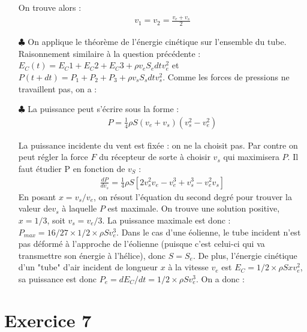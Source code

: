\documentclass{report}
\begin{document}
\begin{itemize}
	On trouve alors :
	\begin{align*}
		v_1=v_2=\frac{v_e+v_s}{2}
	\end{align*}
	
	\item[$\clubsuit$] On applique le théorème de l'énergie cinétique sur l'ensemble du tube. Raisonnement similaire à la question précédente : $E_C(t)=E_C1+E_C2+E_C3+\rho v_e S_e dtv_e^2$ et $P(t+dt)=P_1+P_2+P_3+\rho v_s S_s dtv_s^2$. Comme les forces de pressions ne travaillent pas, on a :
	
	\noindent{}
	
	\item[$\clubsuit$] La puissance peut s'écrire sous la forme :
	\begin{align*}
		P=\frac{1}{4}\rho S(v_e+v_s)(v_s^2-v_e^2)
	\end{align*}	

	La puissance incidente du vent est fixée : on ne la choisit pas. Par contre on peut régler la force $F$ du récepteur de sorte 	à choisir $v_s$ qui maximisera $P$. Il faut étudier P en fonction de $v_S$ :
	\begin{align*}
		\frac{dP}{dv_s}=\frac{1}{4}\rho S\left[2v_s^2v_e-v_e^3+v_s^3-v_e^2v_s \right] 
	\end{align*}
	En posant $x=v_s/v_e$, on résout l'équation du second degré pour trouver la valeur de$v_s$ à laquelle $P$ est maximale. On trouve une solution positive, $x=1/3$, soit $v_s=v_e/3$.
	La puissance maximale est donc : $P_{max}=16/27\times1/2\times\rho Sv_e^3 $. Dans le cas d'une éolienne, le tube incident n'est pas déformé à l'approche de l'éolienne (puisque c'est celui-ci qui va transmettre son énergie à l'hélice), donc $S=S_e$. De plus, l'énergie cinétique d'un "tube" d'air incident de longueur $x$ à la vitesse $v_e$ est $E_C=1/2\times\rho Sxv_e^2$, sa puissance est donc $P_e=dE_C/dt=1/2\times\rho Sv_e^3$. On a donc :
	
	\noindent{}
	
\end{itemize}

\section*{Exercice 7}
\end{document}
